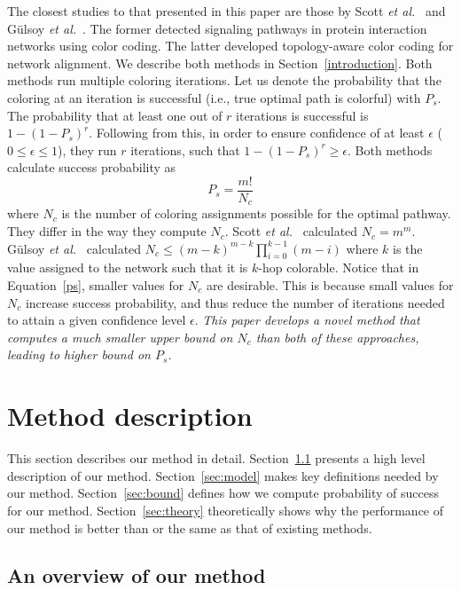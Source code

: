 \documentclass{ws-procs11x85}
\begin{document}
{The closest studies to that presented in this paper are those by Scott
{\it et al.}~\cite{scott} and G{\"u}lsoy {\it et al.}~\cite{gulsoy}.
The former detected signaling pathways in protein interaction networks
using color coding. The latter developed topology-aware color coding
for network alignment. We describe both methods in
Section~\ref{introduction}. Both methods run multiple coloring
iterations. Let us denote the probability that the coloring at an
iteration is successful (i.e., true optimal path is colorful) with
$P_s$. The probability that at least one out of $r$ iterations is
successful is $1 - (1 - P_s)^r$. Following from this, in order to
ensure confidence of at least $\epsilon$ ($0 \leq \epsilon \leq 1$),
they run $r$ iterations, such that $1 - (1 - P_s)^r \geq \epsilon$.
Both methods calculate success probability as
\begin{equation}
P_s = \frac{m!}{N_c}
\label{ps}
\end{equation}
where $N_c$ is the number of coloring assignments possible for the
optimal pathway. They differ in the way they compute $N_c$. Scott {\it
  et al.}~\cite{scott} calculated $N_c = m^m$. G{\"u}lsoy {\it et
  al.}~\cite{gulsoy} calculated $N_c \leq (m - k)^{m - k}
\prod_{i=0}^{k-1} (m - i)$ where $k$ is the value assigned to the
network such that it is $k$-hop colorable. Notice that in
Equation~\ref{ps}, smaller values for $N_c$ are desirable. This is
because small values for $N_c$ increase success probability, and thus
reduce the number of iterations needed to attain a given confidence
level $\epsilon$. {\em This paper develops a novel method that
  computes a much smaller upper bound on $N_c$ than both of these
  approaches, leading to higher bound on $P_s$.  }
}
\section{Method description}
\label{sec:method}

This section describes our method in detail.
Section~\ref{sec:overview} presents a high level description of our
method.  Section~\ref{sec:model} makes key definitions needed by our
method. Section~\ref{sec:bound} defines how we compute probability of
success for our method. Section~\ref{sec:theory} theoretically shows
why the performance of our method is better than or the same as that
of existing methods.


\subsection{An overview of our method}
\label{sec:overview}
\end{document}
